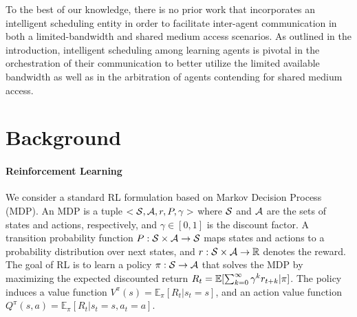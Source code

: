 \documentclass{article} %
\begin{document}
To the best of our knowledge, there is no prior work that incorporates an
intelligent scheduling entity in order to facilitate inter-agent
communication in both a limited-bandwidth and shared medium access
scenarios. As outlined in the introduction, intelligent scheduling
among learning agents is pivotal in the orchestration of their
communication to better utilize the limited available
bandwidth as well as in the arbitration of agents contending 
for shared medium access.


% 
\section{Background}
\label{sec:background}

\paragraph{Reinforcement Learning}
We consider a standard RL formulation based on Markov Decision
Process (MDP). An MDP is a tuple $<{\cal S}, {\cal A}, r, P, \gamma>$ where
${\cal S}$ and ${\cal A}$ are the sets of states and actions, respectively, and
$\gamma \in [0, 1]$ is the discount factor. A transition probability
function $P : {\cal S} \times {\cal A} \rightarrow {\cal S}$ maps states and actions
to a probability distribution over next states, and
$r : {\cal S}\times{\cal A}\rightarrow {\mathbb R}$ denotes the reward. The goal of RL
is to learn a policy $\pi: {\cal S} \rightarrow {\cal A}$ that solves the MDP by
maximizing the expected discounted return
$R_t =\mathbb{E}[ \sum_{k=0}^{\infty} \gamma^{k}r_{t+k}|\pi ]$.  The policy
induces a value function $V^\pi(s)=\mathbb{E}_\pi[R_t|s_t=s]$, and an
action value function $Q^\pi(s,a)=\mathbb{E}_\pi[R_t|s_t=s,a_t=a]$.
\end{document}
